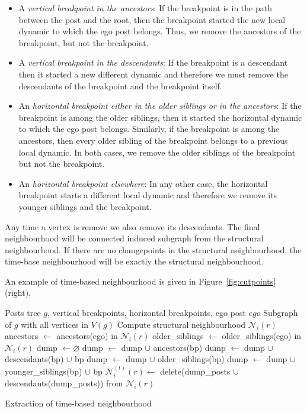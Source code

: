 \documentclass[conference]{IEEEtran}
\begin{document}
\begin{itemize}
\item A \textit{vertical breakpoint in the ancestors}:  If the breakpoint is in the path between the post and the root, then the breakpoint started the new local dynamic to which the ego post belongs. Thus, we remove the ancestors of the breakpoint, but not the breakpoint.
\item A  \textit{vertical breakpoint in the descendants}: If the breakpoint is a descendant then it started a new different dynamic and therefore we must remove the descendants of the breakpoint and the breakpoint itself. 
\item An \textit{horizontal breakpoint either in the older siblings or in the ancestors}: If the breakpoint is among the older siblings, then it started the horizontal dynamic to which the ego post belongs. Similarly, if the breakpoint is among the ancestors, then every older sibling of the breakpoint belongs to a previous local dynamic. In both cases, we remove the older siblings of the breakpoint but not the breakpoint.
\item An \textit{horizontal breakpoint elsewhere}: In any other case, the horizontal breakpoint starts a different local dynamic and therefore we remove its younger siblings and the breakpoint. 
\end{itemize}
Any time a vertex is remove we also remove its descendants. The final neighbourhood will be connected induced subgraph from the structural neighbourhood. If there are no changepoints in the structural neighbourhood, the time-base neighbourhood will be exactly the structural neighbourhood.

An example of time-based neighbourhood is given in Figure~\ref{fig:cutpoints} (right).

\begin{algorithm}[H]
\begin{algorithmic}
\REQUIRE Posts tree $g$, vertical breakpoints, horizontal breakpoints, ego post $ego$
\ENSURE Subgraph of $g$ with all vertices in $V(g)$
\STATE Compute structural neighbourhood $\mathcal{N}_i(r)$
\STATE ancestors $\leftarrow$  ancestors(ego) in $\mathcal{N}_i(r)$
\STATE older\_siblings $\leftarrow$ older\_siblings(ego) in $\mathcal{N}_i(r)$
\STATE dump $\leftarrow \varnothing$
   \STATE dump $\leftarrow$ dump $\cup$ ancestors(bp)
 \ELSE
   \STATE dump $\leftarrow$ dump $\cup$ descendants(bp) $\cup$ bp
  \ENDIF
\ENDFOR
{}
     \STATE dump $\leftarrow$ dump $\cup$ older\_siblings(bp)
   \ELSE
     \STATE dump $\leftarrow$ dump $\cup$ younger\_siblings(bp) $\cup$ bp
  \ENDIF
\ENDFOR
\STATE $\mathcal{N}_i^{(t)}(r) \leftarrow$ delete(dump\_posts $\cup$ descendants(dump\_posts)) from $\mathcal{N}_i(r)$
\end{algorithmic}
\caption{Extraction of time-based neighbourhood}
\label{alg:temporal_neighbourhood}
\end{algorithm}
\end{document}
